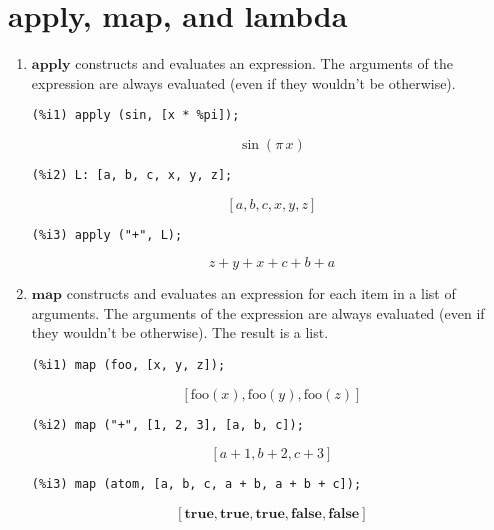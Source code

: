 \documentclass[12pt,leqno]{article}
\begin{document}
\section{apply, map, and lambda}

\begin{enumerate}

\item $\mathbf{apply}$ constructs and evaluates an expression.
The arguments of the expression are always evaluated (even if they wouldn't be otherwise).
\begin{verbatim}
(%i1) apply (sin, [x * %pi]);
\end{verbatim}
\begin{equation}
\sin \left(\pi\,x\right)\tag{\%o1}
\label{eq:doc-group1-code23-1-1}
\end{equation}
\begin{verbatim}
(%i2) L: [a, b, c, x, y, z];
\end{verbatim}
\begin{equation}
\left[ a , b , c , x , y , z \right] \tag{\%o2}
\label{eq:doc-group1-code23-2-1}
\end{equation}
\begin{verbatim}
(%i3) apply ("+", L);
\end{verbatim}
\begin{equation}
z+y+x+c+b+a\tag{\%o3}
\label{eq:doc-group1-code23-3-1}
\end{equation}


\item $\mathbf{map}$ constructs and evaluates an expression for each item in a list of arguments.
The arguments of the expression are always evaluated (even if they wouldn't be otherwise).
The result is a list.
\begin{verbatim}
(%i1) map (foo, [x, y, z]);
\end{verbatim}
\begin{equation}
\left[ \mathrm{foo}\left(x\right) , \mathrm{foo}\left(y\right) , \mathrm{foo}\left(z\right) \right] \tag{\%o1}
\label{eq:doc-group1-code24-1-1}
\end{equation}
\begin{verbatim}
(%i2) map ("+", [1, 2, 3], [a, b, c]);
\end{verbatim}
\begin{equation}
\left[ a+1 , b+2 , c+3 \right] \tag{\%o2}
\label{eq:doc-group1-code24-2-1}
\end{equation}
\begin{verbatim}
(%i3) map (atom, [a, b, c, a + b, a + b + c]);
\end{verbatim}
\begin{equation}
\left[ \mathbf{true} , \mathbf{true} , \mathbf{true} , \mathbf{false} , \mathbf{false} \right] \tag{\%o3}
\label{eq:doc-group1-code24-3-1}
\end{equation}



\end{enumerate}
\end{document}
